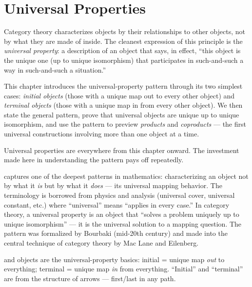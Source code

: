 \chapter{Universal Properties}

\begin{overviewbox}
Category theory characterizes objects by their relationships to other
objects, not by what they are made of inside. The cleanest expression of this
principle is the \emph{universal property}: a description of an object that
says, in effect, ``this object is the unique one (up to unique isomorphism)
that participates in such-and-such a way in such-and-such a situation.''

This chapter introduces the universal-property pattern through its two
simplest cases: \emph{initial objects} (those with a unique map out to every
other object) and \emph{terminal objects} (those with a unique map in from
every other object). We then state the general pattern, prove that universal
objects are unique up to unique isomorphism, and use the pattern to preview
\emph{products} and \emph{coproducts} --- the first universal constructions
involving more than one object at a time.

Universal properties are everywhere from this chapter onward. The investment
made here in understanding the pattern pays off repeatedly.
\end{overviewbox}


\begin{nameorigin}
 captures one of the deepest patterns in
mathematics: characterizing an object not by what it \emph{is} but by
what it \emph{does} — its universal mapping behavior. The terminology
is borrowed from physics and analysis (universal cover, universal
constant, etc.) where ``universal'' means ``applies in every case.''
In category theory, a universal property is an object that
``solves a problem uniquely up to unique isomorphism'' — it is the
universal solution to a mapping question. The pattern was formalized
by Bourbaki (mid-20th century) and made into the central technique of
category theory by Mac Lane and Eilenberg.

 and  objects are the universal-property
basics: initial = unique map \emph{out} to everything; terminal =
unique map \emph{in} from everything. ``Initial'' and ``terminal'' are
from the structure of arrows — first/last in any path.
\end{nameorigin}

